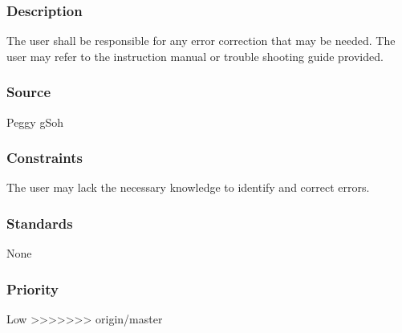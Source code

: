 \subsubsection{Description}
The user shall be responsible for any error correction that may be needed. The user may refer to the instruction manual or trouble shooting guide provided.
\subsubsection{Source}
Peggy gSoh
\subsubsection{Constraints}
The user may lack the necessary knowledge to identify and correct errors.
\subsubsection{Standards}
None
\subsubsection{Priority}
Low
>>>>>>> origin/master
